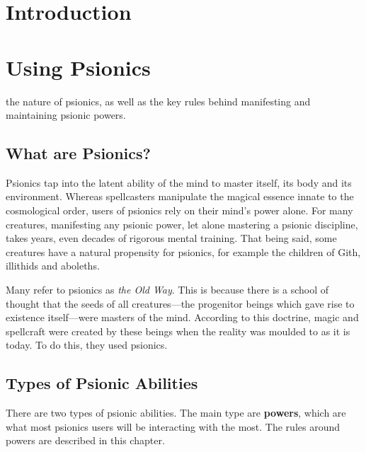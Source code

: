 



\frontmatter
\maketitle
\tableofcontents

\mainmatter%

\chapter{Introduction}


\chapter{Using Psionics}

 the nature of psionics,
as well as the key rules behind
manifesting and maintaining psionic powers.

\section{What are Psionics?}
Psionics tap into the latent ability of the mind
to master itself, its body and its environment.
Whereas spellcasters manipulate the magical essence
innate to the cosmological order,
users of psionics rely on their mind's power alone.
For many creatures,
manifesting any psionic power,
let alone mastering a psionic discipline,
takes years, even decades of rigorous mental training.
That being said,
some creatures have a natural propensity for psionics,
for example the children of Gith, illithids and aboleths.

Many refer to psionics as \emph{the Old Way}.
This is because there is a school of thought that
the seeds of all creatures---the progenitor beings
which gave rise to existence itself---were
masters of the mind.
According to this doctrine,
magic and spellcraft were created by these
beings when the reality was moulded to as it is today.
To do this, they used psionics.

\section{Types of Psionic Abilities}
There are two types of psionic abilities.
The main type are \textbf{powers},
which are what most psionics users will be
interacting with the most.
The rules around powers are described in this chapter.


